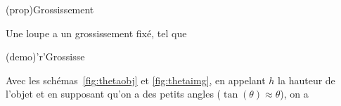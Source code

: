 \documentclass[../../main/main.tex]{subfiles}
\begin{document}
\begin{tcb*}[label=def_gross]
\begin{isd}
		\begin{center}
			\label{fig:thetaimg}
		\end{center}
	\end{isd}
\end{tcb*}

\begin{tcbraster}[raster equal height=rows, raster columns=2]
	\begin{tcb*}[label=prop_loupe,
			list entry={\lte\theprop~: Grossissement loupe}
		](prop){Grossissement}

		Une loupe a un grossissement fixé, tel que
	\end{tcb*}
	\begin{tcb*}[label=demo_gross-loupe,
			list entry={\lte\thedemo~: Grossissement loupe}
		](demo)'r'{Grossisse\mnt}

		Avec les schémas~\ref{fig:thetaobj} et \ref{fig:thetaimg}, en appelant $h$
		la hauteur de l'objet et en supposant qu'on a des petits angles
		($\tan(\theta)\approx\theta$), on a
	\end{tcb*}
\end{tcbraster}
\end{document}
